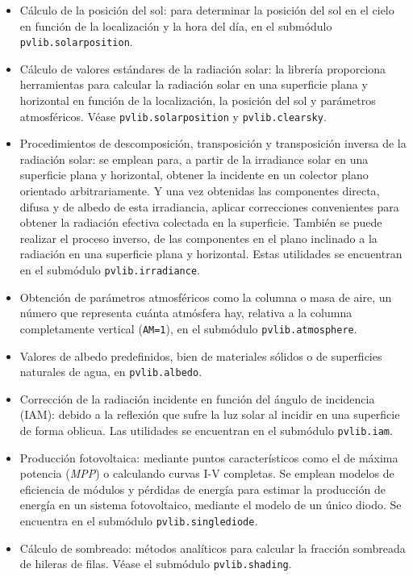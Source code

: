 \begin{itemize}
    \item Cálculo de la posición del sol: para determinar la posición del sol en el cielo en función de la localización y la hora del día, en el \gls{submódulo} \texttt{pvlib.solarposition}.
    \item Cálculo de valores estándares de la radiación solar: la librería proporciona herramientas para calcular la \gls{radiación solar} en una superficie plana y horizontal en función de la localización, la posición del sol y parámetros atmosféricos. Véase \texttt{pvlib.solarposition} y \texttt{pvlib.clearsky}.
    \item Procedimientos de descomposición, \gls{transposición} y \gls{transposición inversa} de la radiación solar: se emplean para, a partir de la irradiance solar en una superficie plana y horizontal, obtener la incidente en un colector plano orientado arbitrariamente. Y una vez obtenidas las componentes \gls{directa}, \gls{difusa} y de \gls{albedo} de esta irradiancia, aplicar correcciones convenientes para obtener la radiación efectiva colectada en la superficie. También se puede realizar el proceso inverso, de las componentes en el plano inclinado a la radiación en una superficie plana y horizontal. Estas utilidades se encuentran en el submódulo \texttt{pvlib.irradiance}.
    \item Obtención de parámetros atmosféricos como la columna o masa de aire, un número que representa cuánta atmósfera hay, relativa a la columna completamente vertical (\texttt{AM=1}), en el submódulo \texttt{pvlib.atmosphere}.
    \item Valores de \gls{albedo} predefinidos, bien de materiales sólidos o de superficies naturales de agua, en \texttt{pvlib.albedo}.
    \item Corrección de la radiación incidente en función del ángulo de incidencia (\gls{IAM}): debido a la reflexión que sufre la luz solar al incidir en una superficie de forma oblicua. Las utilidades se encuentran en el submódulo \texttt{pvlib.iam}.
    \item Producción fotovoltaica: mediante puntos característicos como el de máxima potencia (\textit{MPP}) o calculando curvas I-V completas. Se emplean modelos de eficiencia de módulos y pérdidas de energía para estimar la producción de energía en un sistema fotovoltaico, mediante el modelo de un único \gls{diodo}. Se encuentra en el submódulo \texttt{pvlib.singlediode}.
    \item Cálculo de sombreado: métodos analíticos para calcular la fracción sombreada de hileras de filas. Véase el submódulo \texttt{pvlib.shading}.

\end{itemize}
